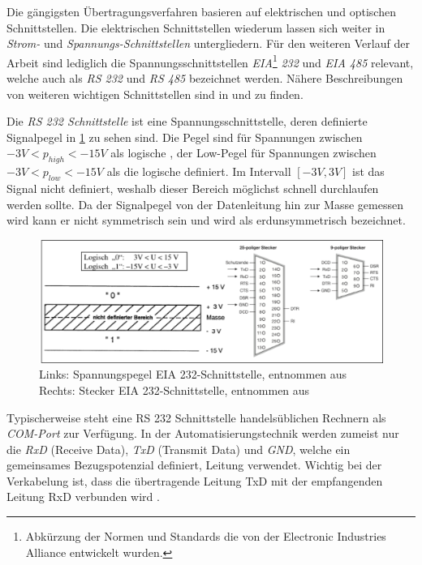 Die gängigsten Übertragungsverfahren basieren auf elektrischen und optischen Schnittstellen. Die elektrischen Schnittstellen wiederum lassen sich weiter in \textit{Strom-} und \textit{Spannungs-Schnittstellen} untergliedern. Für den weiteren Verlauf der Arbeit sind lediglich die Spannungsschnittstellen \textit{EIA}\footnote{Abkürzung der Normen und Standards die von der Electronic Industries Alliance entwickelt wurden.}\textit{ 232} und \textit{EIA 485} relevant, welche auch als \textit{RS 232} und \textit{RS 485} bezeichnet werden. Nähere Beschreibungen von weiteren wichtigen Schnittstellen sind in \cite[S.~13ff.]{sch08} und \cite[S.~57ff.]{schn06} zu finden.

Die \textit{RS 232 Schnittstelle} ist eine Spannungsschnittstelle, deren definierte Signalpegel in \ref{fig:rs232} zu sehen sind. Die Pegel sind für Spannungen zwischen $-3V<p_{high}<-15V$ als logische \Gob, der Low-Pegel für Spannungen zwischen $-3V<p_{low}<-15V$ als die logische \Gob definiert. Im Intervall $[-3V,3V]$ ist das Signal nicht definiert, weshalb dieser Bereich möglichst schnell durchlaufen werden sollte. Da der Signalpegel von der Datenleitung hin zur Masse gemessen wird kann er nicht symmetrisch sein und wird als erdunsymmetrisch bezeichnet. \cite[S.~57f.]{schn06}

\begin{figure}
\centering
\includegraphics[width=\textwidth]{abbildungen/20160314_rs232}
\caption[Spannungspegel und Stecker der EIA 232-Schnittstelle]{Links: Spannungspegel EIA 232-Schnittstelle, entnommen aus \cite[S.~57]{schn06} \newline Rechts: Stecker EIA 232-Schnittstelle, entnommen aus \cite[S.~14]{sch08}}
\label{fig:rs232}
\end{figure}

Typischerweise steht eine RS 232 Schnittstelle handelsüblichen Rechnern als \textit{COM-Port} zur Verfügung. In der Automatisierungstechnik werden zumeist nur die \textit{RxD} (Receive Data), \textit{TxD} (Transmit Data) und \textit{GND}, welche ein gemeinsames Bezugspotenzial definiert, Leitung verwendet. Wichtig bei der Verkabelung ist, dass die übertragende Leitung TxD mit der empfangenden Leitung RxD verbunden wird \cite[S.~14f.]{sch08}.

